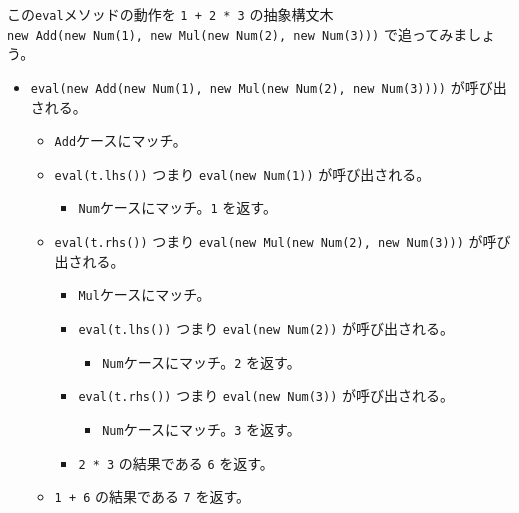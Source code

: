 この\texttt{eval}メソッドの動作を \texttt{1\ +\ 2\ *\ 3} の抽象構文木
\texttt{new\ Add(new\ Num(1),\ new\ Mul(new\ Num(2),\ new\ Num(3)))}
で追ってみましょう。

\begin{itemize}
\tightlist
\item
  \texttt{eval(new\ Add(new\ Num(1),\ new\ Mul(new\ Num(2),\ new\ Num(3))))}
  が呼び出される。

  \begin{itemize}
  \tightlist
  \item
    \texttt{Add}ケースにマッチ。
  \item
    \texttt{eval(t.lhs())} つまり \texttt{eval(new\ Num(1))}
    が呼び出される。

    \begin{itemize}
    \tightlist
    \item
      \texttt{Num}ケースにマッチ。\texttt{1} を返す。
    \end{itemize}
  \item
    \texttt{eval(t.rhs())} つまり
    \texttt{eval(new\ Mul(new\ Num(2),\ new\ Num(3)))} が呼び出される。

    \begin{itemize}
    \tightlist
    \item
      \texttt{Mul}ケースにマッチ。
    \item
      \texttt{eval(t.lhs())} つまり \texttt{eval(new\ Num(2))}
      が呼び出される。

      \begin{itemize}
      \tightlist
      \item
        \texttt{Num}ケースにマッチ。\texttt{2} を返す。
      \end{itemize}
    \item
      \texttt{eval(t.rhs())} つまり \texttt{eval(new\ Num(3))}
      が呼び出される。

      \begin{itemize}
      \tightlist
      \item
        \texttt{Num}ケースにマッチ。\texttt{3} を返す。
      \end{itemize}
    \item
      \texttt{2\ *\ 3} の結果である \texttt{6} を返す。
    \end{itemize}
  \item
    \texttt{1\ +\ 6} の結果である \texttt{7} を返す。
  \end{itemize}
\end{itemize}

